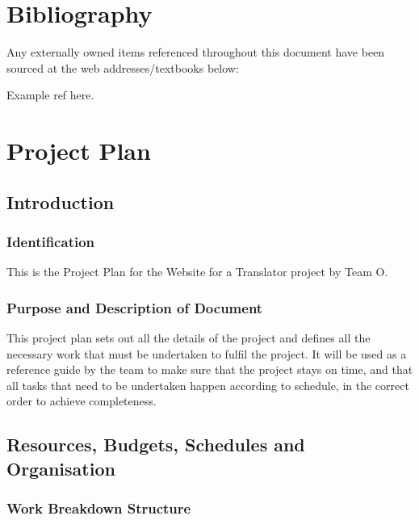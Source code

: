 \documentclass{l3proj}
\begin{document}
\chapter{Bibliography}
\label{chap:bibl}
Any externally owned items referenced throughout this document have been sourced
at the web addresses/textbooks below:
\begin{itemize}
\small{
\item Example ref here.
}
\end{itemize}
\chapter{Project Plan}
\label{chap:proj-plan}
\section{Introduction}
\label{sect:pp-intro}
\subsection{Identification}
This is the Project Plan for the Website for a Translator project by Team O.

\subsection{Purpose and Description of Document}
This project plan sets out all the details of the project and defines all the
necessary work that must be undertaken to 
fulfil the project. It will be used as a reference guide by the team to make
sure that the project stays on time, and that all tasks 
that need to be undertaken happen according to schedule, in the correct order to achieve completeness.

\section{Resources, Budgets, Schedules and Organisation}
\label{sect:rbso}
\subsection{Work Breakdown Structure} 
\end{document}
